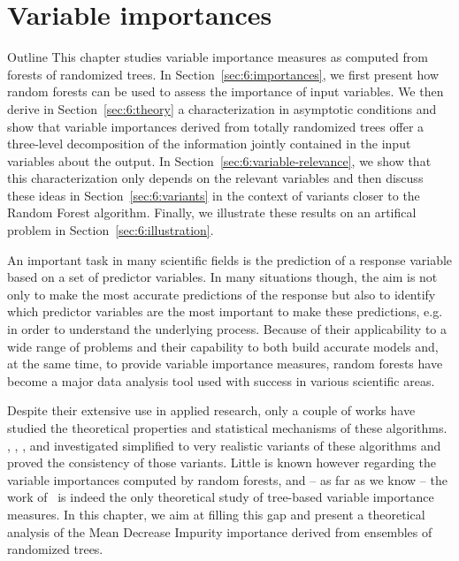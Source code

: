 \chapter{Variable importances}\label{ch:importances}

\begin{remark}{Outline}
This chapter studies variable importance measures as computed from forests of
randomized trees. In Section~\ref{sec:6:importances}, we first present how
random forests can be used to assess the importance of input variables.  We
then derive in Section~\ref{sec:6:theory} a characterization in asymptotic
conditions and show that variable importances derived from totally randomized trees
offer a three-level decomposition of the information jointly  contained in the
input variables about the output. In Section~\ref{sec:6:variable-relevance}, we
show that this  characterization only depends on the relevant variables and
then discuss these ideas in Section~\ref{sec:6:variants} in the context of
variants closer to the Random Forest algorithm. Finally, we illustrate these
results on an artifical problem in Section~\ref{sec:6:illustration}.
\end{remark}

An important task in many scientific fields is the prediction of  a response
variable based on a set of predictor variables. In many situations though, the
aim is not only to make the most accurate predictions of the response but also
to identify which predictor variables are the most important to make these
predictions, e.g. in order to understand the underlying process. Because of
their applicability to a wide range of problems and their capability to both
build accurate models and, at the same time, to provide variable importance
measures, random forests have become a major data analysis tool used with
success in various scientific areas.

Despite their extensive use in applied research, only a couple of works have
studied the theoretical properties and statistical mechanisms of these
algorithms. \citet{zhao:2000}, \citet{breiman:2004},
\citet{biau:2008,biau:2012}, \citet{meinshausen:2006} and \citet{lin:2006}
investigated simplified to very realistic variants of these algorithms and
proved  the consistency of those variants. Little is known however regarding
the variable importances computed by random forests, and -- as far as we know
-- the work of~\citet{ishwaran:2007} is indeed the only theoretical study of
tree-based variable importance measures. In this chapter, we aim at filling
this gap and present a theoretical  analysis of the Mean Decrease Impurity
importance derived from ensembles of randomized trees.


